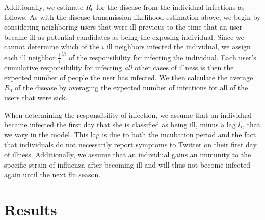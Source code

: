 Additionally, we estimate \(R_0\) for the disease from the individual infections as follows. As with the disease transmission likelihood estimation above, we begin by considering neighboring users that were ill previous to the time that an user became ill as potential candidates as being the exposing individual. Since we cannot determine which of the \(i\) ill neighbors infected the individual, we assign each ill neighbor \(\frac{1}{i}^{th}\) of the responsibility for infecting the individual. Each user's cumulative responsibility for infecting \emph{all} other cases of illness is then the expected number of people the user has infected. We then calculate the average \(R_0\) of the disease by averaging the expected number of infections for all of the users that were sick.

When determining the responsibility of infection, we assume that an individual became infected the first day that she is classified as being ill, minus a lag \(l_t\), that we vary in the model. This lag is due to both the incubation period and the fact that individuals do not necessarily report symptoms to Twitter on their first day of illness. Additionally, we assume that an individual gains an immunity to the specific strain of influenza after becoming ill and will thus not become infected again until the next flu season.



\section{Results}
\label{sec:resultsLongitude}

